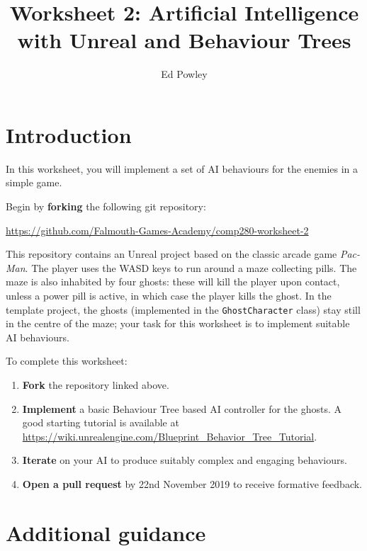 \documentclass{../../fal_assignment}
\title{Worksheet 2: Artificial Intelligence with Unreal and Behaviour Trees}
\author{Ed Powley}
\begin{document}
\maketitle


\section*{Introduction}

In this worksheet, you will implement a set of AI behaviours for the enemies in a simple game.

Begin by \textbf{forking} the following git repository:

\begin{center}
	\url{https://github.com/Falmouth-Games-Academy/comp280-worksheet-2}
\end{center}

This repository contains an Unreal project based on the classic arcade game \emph{Pac-Man}.
The player uses the WASD keys to run around a maze collecting pills.
The maze is also inhabited by four ghosts:
these will kill the player upon contact, unless a power pill is active, in which case the player kills the ghost.
In the template project, the ghosts (implemented in the \texttt{GhostCharacter} class) stay still in the centre of the maze;
your task for this worksheet is to implement suitable AI behaviours.

To complete this worksheet:

\begin{enumerate}
	\item \textbf{Fork} the repository linked above.
	\item \textbf{Implement} a basic Behaviour Tree based AI controller for the ghosts.
		A good starting tutorial is available at \url{https://wiki.unrealengine.com/Blueprint_Behavior_Tree_Tutorial}.
	\item \textbf{Iterate} on your AI to produce suitably complex and engaging behaviours.
	\item \textbf{Open a pull request} by 22nd November 2019 to receive formative feedback.
\end{enumerate}

\section*{Additional guidance}
\end{document}
